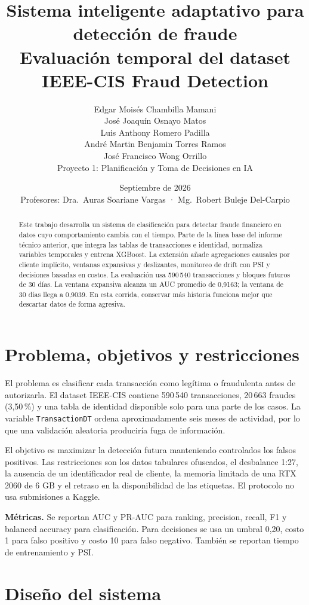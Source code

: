 \documentclass[11pt,a4paper]{article}
\title{\vspace{-1.2cm}\color{ink}\textbf{Sistema inteligente adaptativo para detección de fraude}\\
\large\color{slate}Evaluación temporal del dataset IEEE-CIS Fraud Detection}
\author{Edgar Moisés Chambilla Mamani\\
        José Joaquín Osnayo Matos\\
        Luis Anthony Romero Padilla\\
        André Martin Benjamin Torres Ramos\\
        José Francisco Wong Orrillo\\[10pt]
        {\small Proyecto 1: Planificación y Toma de Decisiones en IA}}
\date{Septiembre de 2026\\[6pt]
      {\small\color{slate}Profesores: Dra.\ Auras Soariane Vargas · Mg.\ Robert Buleje Del-Carpio}}
\begin{document}
\maketitle
\vspace{-0.5cm}

\begin{abstract}
Este trabajo desarrolla un sistema de clasificación para detectar fraude financiero en datos cuyo
comportamiento cambia con el tiempo. Parte de la línea base del informe técnico anterior, que integra
las tablas de transacciones e identidad, normaliza variables temporales y entrena XGBoost. La extensión
añade agregaciones causales por cliente implícito, ventanas expansivas y deslizantes, monitoreo de drift
con PSI y decisiones basadas en costos. La evaluación usa 590\,540 transacciones y bloques futuros de
30 días. La ventana expansiva alcanza un AUC promedio de 0,9163; la ventana de 30 días llega a 0,9039.
En esta corrida, conservar más historia funciona mejor que descartar datos de forma agresiva.
\end{abstract}

\section{Problema, objetivos y restricciones}

El problema es clasificar cada transacción como legítima o fraudulenta antes de autorizarla. El dataset
IEEE-CIS contiene 590\,540 transacciones, 20\,663 fraudes (3,50\,\%) y una tabla de identidad
disponible solo para una parte de los casos. La variable \texttt{TransactionDT} ordena aproximadamente seis
meses de actividad, por lo que una validación aleatoria produciría fuga de información.

El objetivo es maximizar la detección futura manteniendo controlados los falsos positivos. Las
restricciones son los datos tabulares ofuscados, el desbalance 1:27, la ausencia de un identificador
real de cliente, la memoria limitada de una RTX 2060 de 6 GB y el retraso en la disponibilidad de las
etiquetas. El protocolo no usa submisiones a Kaggle.

\textbf{Métricas.} Se reportan AUC y PR-AUC para ranking, precision, recall, F1 y balanced accuracy
para clasificación. Para decisiones se usa un umbral 0,20, costo 1 para falso positivo y costo 10
para falso negativo. También se reportan tiempo de entrenamiento y PSI.

\section{Diseño del sistema}
\end{document}
